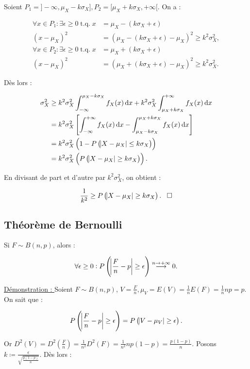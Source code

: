 \documentclass{article}
\DeclareMathOperator{\tq}{\text{ t.q. }}
\begin{document}
		Soient $P_1 = ]-\infty, \mu_X-k\sigma_X], P_2 = [\mu_X+k\sigma_X, +\infty[$. On a :

		\begin{align*}
			\forall x \in P_1 : \exists \epsilon \geq 0 \tq x &= \mu_X - (k\sigma_X + \epsilon) \\
			                                      (x-\mu_X)^2 &= (\mu_X - (k\sigma_X+\epsilon) - \mu_X)^2 \geq k^2\sigma_X^2, \\
			\forall x \in P_2 : \exists \epsilon \geq 0 \tq x &= \mu_X + (k\sigma_X + \epsilon) \\
			                                      (x-\mu_X)^2 &= (\mu_X + (k\sigma_X+\epsilon) - \mu_X)^2 \geq k^2\sigma_X^2.
		\end{align*}

		Dès lors :

		\begin{align*}
			\sigma_X^2 &\geq k^2\sigma_X^2\int_{-\infty}^{\mu_X-k\sigma_X}f_X(x)\dif x + k^2\sigma_X^2\int_{\mu_X+k\sigma_X}^{+\infty}f_X(x)\dif x \\
			           &= k^2\sigma_X^2\left[ \int_{-\infty}^{+\infty}f_X(x)\dif x - \int_{\mu_X-k\sigma_X}^{\mu_X+k\sigma_X}f_X(x)\dif x \right] \\
					   &= k^2\sigma_X^2\left(1-P\left(\abs{X-\mu_X} \leq k\sigma_X\right)\right) \\
					   &= k^2\sigma_X^2\left(P\left(\abs{X-\mu_X} \geq k\sigma_X\right)\right).
		\end{align*}

		En divisant de part et d'autre par $k^2\sigma_X^2$, on obtient :

		\[\frac 1{k^2} \geq P\left(\abs{X-\mu_X} \geq k\sigma_X\right).\;\;\;\square\]

	\subsection{Théorème de Bernoulli}
		Si $F \sim B(n, p)$, alors :

		\[\forall \epsilon \geq 0 : P\left(\abs{\frac Fn - p} \geq \epsilon\right) \stackrel{n\to+\infty}{\longrightarrow}0.\]

		\underline{Démonstration : } Soient $F \sim B(n, p)$, $V = \frac Fn, \mu_V = E(V) = \frac 1nE(F) = \frac 1nnp = p$. On sait que :

		\[P\left( \abs{\frac Fn-p} \geq \epsilon \right) = P\left( \abs{V-\mu_V} \geq \epsilon\right).\]

		Or $D^2(V) = D^2\left(\frac Fn\right) = \frac 1{n^2}D^2(F) = \frac 1{n^2}np(1-p) = \frac {p(1-p)}n$. Posons $k \coloneqq \frac \epsilon{\sqrt {\frac {p(1-p)}n}}$. Dès lors :
\end{document}
